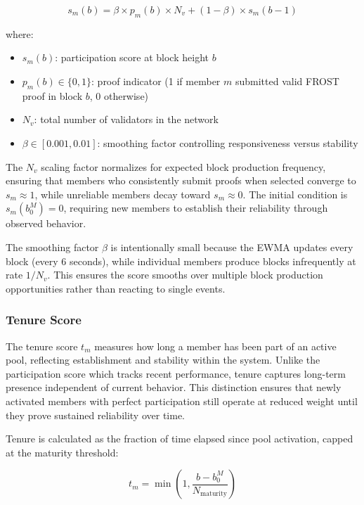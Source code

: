 \begin{equation}
    \label{eq:participation-score}
    s_m(b) = \beta \times p_m(b) \times N_v + (1 - \beta) \times s_m(b-1)
\end{equation}

where:
\begin{itemize}
    \item $s_m(b)$: participation score at block height $b$
    \item $p_m(b) \in \{0, 1\}$: proof indicator (1 if member $m$ submitted valid FROST proof in block $b$, 0 otherwise)
    \item $N_v$: total number of validators in the network
    \item $\beta \in [0.001, 0.01]$: smoothing factor controlling responsiveness versus stability
\end{itemize}

The $N_v$ scaling factor normalizes for expected block production frequency, ensuring that members who consistently submit proofs when selected converge to $s_m \approx 1$, while unreliable members decay toward $s_m \approx 0$. The initial condition is $s_m(b_0^M) = 0$, requiring new members to establish their reliability through observed behavior.

The smoothing factor $\beta$ is intentionally small because the EWMA updates every block (every 6 seconds), while individual members produce blocks infrequently at rate $1/N_v$. This ensures the score smooths over multiple block production opportunities rather than reacting to single events.

\subsubsection{Tenure Score}
\label{sec:tenure-score}

The tenure score $t_m$ measures how long a member has been part of an active pool, reflecting establishment and stability within the system. Unlike the participation score which tracks recent performance, tenure captures long-term presence independent of current behavior. This distinction ensures that newly activated members with perfect participation still operate at reduced weight until they prove sustained reliability over time.

Tenure is calculated as the fraction of time elapsed since pool activation, capped at the maturity threshold:

\begin{equation}
    t_m = \min\left(1, \frac{b - b_0^M}{N_{\text{maturity}}}\right)
\end{equation}

